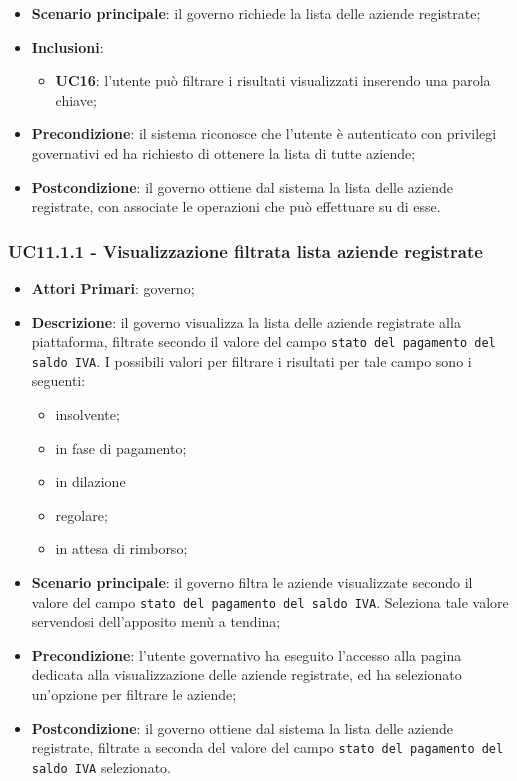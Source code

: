 \begin{itemize}
	\item \textbf{Scenario principale}: il governo richiede la lista delle aziende registrate;
	\item \textbf{Inclusioni}:
	\begin{itemize}
		\item \textbf{UC16}: l'utente può filtrare i risultati visualizzati inserendo una parola chiave;
	\end{itemize}
	\item \textbf{Precondizione}: il sistema riconosce che l'utente è autenticato con privilegi governativi ed ha richiesto di ottenere la lista di tutte aziende;
	\item \textbf{Postcondizione}: il governo ottiene dal sistema la lista delle aziende registrate, con associate le operazioni che può effettuare su di esse.
\end{itemize}

\subsubsection{UC11.1.1 - Visualizzazione filtrata lista aziende registrate}
\begin{itemize}
	\item \textbf{Attori Primari}: governo;
	\item \textbf{Descrizione}: il governo visualizza la lista delle aziende registrate alla piattaforma, filtrate secondo il valore del campo \texttt{stato del pagamento del saldo IVA}. I possibili valori per filtrare i risultati per tale campo sono i seguenti:
	\begin{itemize}
		\item insolvente;
		\item in fase di pagamento;
		\item in dilazione
		\item regolare;
		\item in attesa di rimborso;
	\end{itemize}
	
	\item \textbf{Scenario principale}: il governo filtra le aziende visualizzate secondo il valore del campo \texttt{stato del pagamento del saldo IVA}. Seleziona tale valore servendosi dell'apposito menù a tendina;
	\item \textbf{Precondizione}: l'utente governativo ha eseguito l'accesso alla pagina dedicata alla visualizzazione delle aziende registrate, ed ha selezionato un'opzione per filtrare le aziende;
	\item \textbf{Postcondizione}: il governo ottiene dal sistema la lista delle aziende registrate, filtrate a seconda del valore del campo \texttt{stato del pagamento del saldo IVA} selezionato.
\end{itemize}


